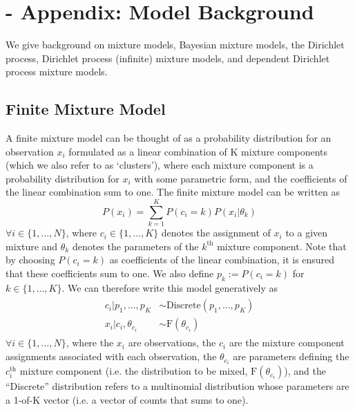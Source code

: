 \documentclass[twocolumn, final]{svjour3}
\begin{document}
\appendix

\newpage

\section{-  Appendix: Model Background}
\label{sec:modelbackground}

We give background on mixture models, Bayesian mixture models, the Dirichlet process, Dirichlet process (infinite) mixture models, and dependent Dirichlet process mixture models.


\subsection{Finite Mixture Model}
\label{sec:finitemixture}

A finite mixture model can be thought of as a probability distribution for an observation $x_{i}$ formulated as a linear combination of K mixture components (which we also refer to as `clusters'), where each mixture component is a probability distribution for $x_{i}$ with some parametric form, and the coefficients of the linear combination sum to one. The finite mixture model can be written as
\begin{equation}
P(x_{i}) = \sum_{k=1}^{K} P(c_{i} = k)P(x_{i}|\theta_{k})
\end{equation}
$\forall i \in \{ 1, \ldots, N \}$, where $c_{i} \in \{ 1, \ldots, K \}$ denotes the assignment of $x_{i}$ to a given mixture and $\theta_{k}$ denotes the parameters of the $k^{\text{th}}$ mixture component. Note that by choosing $P(c_{i} = k)$ as coefficients of the linear combination, it is ensured that these coefficients sum to one. We also define $p_{k} := P(c_{i} = k)$ for $k \in \{ 1, \ldots, K \} $. We can therefore write this model generatively as
\begin{align}
\begin{split}
  c_{i}|p_{1}, \ldots, p_{K}  &\sim  \text{Discrete}(p_{1}, \ldots, p_{K}) \\
  x_{i}|c_{i}, \theta_{c_{i}}  &\sim  \text{F}(\theta_{c_{i}})
\end{split}
\end{align}
$\forall i \in \{ 1, \ldots, N \}$, where the $x_{i}$ are observations, the $c_{i}$ are the mixture component assignments associated with each observation, the $\theta_{c_{i}}$ are parameters defining the $c_{i}^{\text{th}}$ mixture component (i.e. the distribution to be mixed, $\text{F}(\theta_{c_{i}})$), and the ``Discrete'' distribution refers to a multinomial distribution whose parameters are a 1-of-K vector (i.e. a vector of counts that sums to one).
\end{document}
